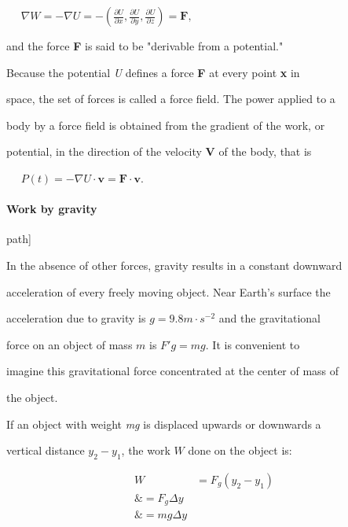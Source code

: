 $\quad$ $\nabla W =  -\nabla U= -\left(\frac{\partial U}{\partial x}, \frac{\partial U}{\partial y}, \frac{\partial U}{\partial z}\right) = \mathbf{F},$



and the force \textbf{F} is said to be "derivable from a potential."



Because the potential \textit{U} defines a force \textbf{F} at every point \textbf{x} in

space, the set of forces is called a force field. The power applied to a

body by a force field is obtained from the gradient of the work, or

potential, in the direction of the velocity \textbf{V} of the body, that is



$\quad$ $P(t) = -\nabla U \cdot \mathbf{v} = \mathbf{F}\cdot\mathbf{v}.$



\paragraph{Work by gravity}




path]



In the absence of other forces, gravity results in a constant downward

acceleration of every freely moving object. Near Earth's surface the

acceleration due to gravity is $g = 9.8 m \cdot s^{-2}$ and the gravitational

force on an object of mass $m$ is $F' g = mg$. It is convenient to

imagine this gravitational force concentrated at the center of mass of

the object.



If an object with weight \textit{mg} is displaced upwards or downwards a

vertical distance $y _2 - y _1$, the work $W$ done on the object is:



\begin{align}
W &= F _g (y _2 - y _1) \\\&= F _g \Delta y \\\&= mg \Delta y
\end{align}



